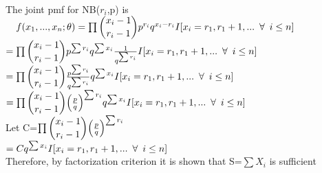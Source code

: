 \\

The joint pmf for NB($r_i$,p) is \\

$ \quad f(x_1,...,x_n; \mathbf{\theta}) = \prod \dbinom{x_i - 1}{r_i - 1} p^{r_i} q^{x_i - r_i} I[x_i = r_1, r_1 + 1,... \enskip \forall \enskip i\le n]$\\

$ = \prod \dbinom{x_i - 1}{r_i - 1} p^{\sum{r_i}} q^{\sum{x_i}} \frac{1}{q^{\sum{r_i}}} I[x_i = r_1, r_1 + 1,... \enskip \forall \enskip i\le n]$\\

$ = \prod \dbinom{x_i - 1}{r_i - 1} \frac{p^{\sum{r_i}}}{q^{\sum{r_i}}} q^{\sum{x_i}} I[x_i = r_1, r_1 + 1,... \enskip \forall \enskip i\le n]$\\

$ = \prod \dbinom{x_i - 1}{r_i - 1} \Big(\frac{p}{q}\Big)^{\sum{r_i}} q^{\sum{x_i}} I[x_i = r_1, r_1 + 1,... \enskip \forall \enskip i\le n]$\\

Let C=$ \prod \dbinom{x_i - 1}{r_i - 1} \Big(\frac{p}{q}\Big)^{\sum{r_i}}$ \\

$ = C q^{\sum{x_i}} I[x_i = r_1, r_1 + 1,... \enskip \forall \enskip i\le n]$\\

Therefore, by factorization criterion it is shown that S=$\sum{X_i}$ is sufficient\\